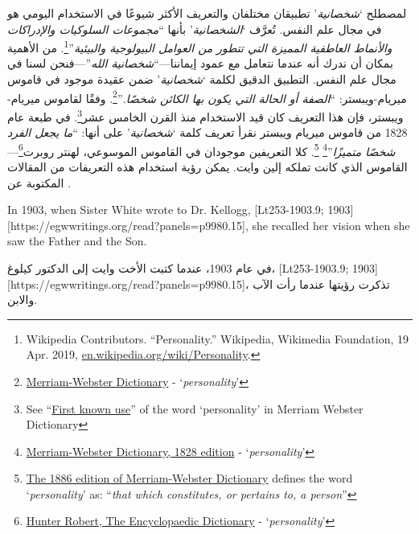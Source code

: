 لمصطلح ‘\textit{شخصانية}’ تطبيقان مختلفان والتعريف الأكثر شيوعًا في الاستخدام اليومي هو في مجال علم النفس. تُعرَّف ‘\textit{الشخصانية}’ بأنها “\textit{مجموعات السلوكيات والإدراكات والأنماط العاطفية المميزة التي تتطور من العوامل البيولوجية والبيئية}”\footnote{Wikipedia Contributors. “Personality.” Wikipedia, Wikimedia Foundation, 19 Apr. 2019, \href{https://en.wikipedia.org/wiki/Personality}{en.wikipedia.org/wiki/Personality}.}. من الأهمية بمكان أن ندرك أنه عندما نتعامل مع عمود إيماننا—“\textit{شخصانية الله}”—فنحن لسنا في مجال علم النفس. التطبيق الدقيق لكلمة ‘\textit{شخصانية}’ ضمن عقيدة  موجود في قاموس ميريام-ويبستر: “\textit{الصفة أو الحالة التي يكون بها الكائن شخصًا.}”\footnote{\href{https://www.merriam-webster.com/dictionary/personality}{Merriam-Webster Dictionary} - ‘\textit{personality}’}. وفقًا لقاموس ميريام-ويبستر، فإن هذا التعريف كان قيد الاستخدام منذ القرن الخامس عشر\footnote{See “\href{https://www.merriam-webster.com/dictionary/personality\#word-history}{First known use}” of the word ‘personality’ in Merriam Webster Dictionary}. في طبعة عام 1828 من قاموس ميريام ويبستر نقرأ تعريف كلمة ‘\textit{شخصانية}’ على أنها: “\textit{ما يجعل الفرد شخصًا متميزًا}”\footnote{\href{https://archive.org/details/americandictiona02websrich/page/272/mode/2up}{Merriam-Webster Dictionary, 1828 edition} - ‘\textit{personality}’} \footnote{\href{https://archive.org/details/websterscomplete00webs/page/974/mode/2up}{The 1886 edition of Merriam-Webster Dictionary} defines the word ‘\textit{personality}’ as: “\textit{that which constitutes, or pertains to, a person}”}. كلا التعريفين موجودان في القاموس الموسوعي، لهنتر روبرت\footnote{\href{https://babel.hathitrust.org/cgi/pt?id=mdp.39015050663213&view=1up&seq=780}{Hunter Robert, The Encyclopaedic Dictionary} - ‘\textit{personality}’}—القاموس الذي كانت تملكه إلين وايت. يمكن رؤية استخدام هذه التعريفات من المقالات المكتوبة عن .


In 1903, when Sister White wrote to Dr. Kellogg, [Lt253-1903.9; 1903][https://egwwritings.org/read?panels=p9980.15], she recalled her vision when she saw the Father and the Son.


في عام 1903، عندما كتبت الأخت وايت إلى الدكتور كيلوغ، [Lt253-1903.9; 1903][https://egwwritings.org/read?panels=p9980.15]، تذكرت رؤيتها عندما رأت الآب والابن.


